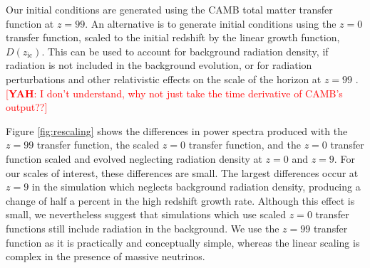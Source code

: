 \documentclass[useAMS, usenatbib]{mnras}
\newcommand{\yah}[1]{{\textcolor{red}{[{\bf YAH}: #1]}}}
\begin{document}
Our initial conditions are generated using the CAMB total matter transfer
function at $z=99$. An alternative is to generate initial conditions
using the $z=0$ transfer function, scaled to the initial redshift by the 
linear growth function, $D(z_\mathrm{ic})$. This can
be used to account for background radiation density, if radiation is not included
in the background evolution, or for radiation perturbations and other relativistic
effects on the scale of the horizon at $z=99$ \citep{Zennaro_2017}. \yah{I don't understand, why not just take the time derivative of CAMB's output??}

Figure \ref{fig:rescaling} shows the differences in power spectra 
produced with the $z=99$ transfer function, the
scaled $z=0$ transfer function, and the $z=0$ transfer function
scaled and evolved neglecting radiation density at $z=0$ and $z=9$.
For our scales of interest, these differences are small.
The largest differences occur at $z=9$ in the simulation which neglects 
background radiation density, producing a change of half a percent in 
the high redshift growth rate. Although this effect is small, we nevertheless suggest that simulations
which use scaled $z=0$ transfer functions still include radiation in the background.
We use the $z=99$ transfer function as it is practically and conceptually simple,
whereas the linear scaling is complex in the presence of massive neutrinos.

\label{lastpage}


\end{document}
